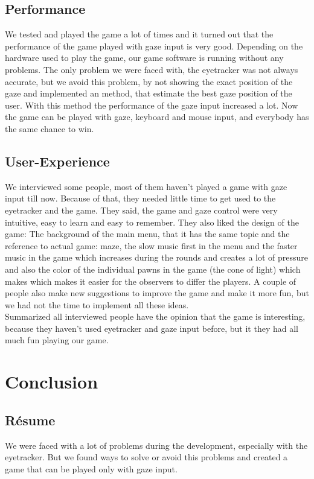 \documentclass{sigchi}
\begin{document}
\subsection{Performance}
We tested and played the game a lot of times and it turned out that the performance of the game played with gaze input is very good. Depending on the hardware used to play the game, our game software is running without any problems. The only problem we were faced with, the eyetracker was not always accurate, but we avoid this problem, by not showing the exact position of the gaze and implemented an method, that estimate the best gaze position of the user. With this method the performance of the gaze input increased a lot. Now the game can be played with gaze, keyboard and mouse input, and everybody has the same chance to win.
\subsection{User-Experience}
We interviewed some people, most of them haven't played a game with gaze input till now. Because of that, they needed little time to get used to the eyetracker and the game. They said, the game and gaze control were very intuitive, easy to learn and easy to remember. They also liked the design of the game: The background of the main menu, that it has the same topic and the reference to actual game: maze, the slow music first in the menu and the faster music in the game which increases during the rounds and creates a lot of pressure and also the color of the individual pawns in the game (the cone of light) which makes which makes it easier for the observers to differ the players.
A couple of people also make new suggestions to improve the game and make it more fun, but we had not the time to implement all these ideas.\\
Summarized all interviewed people have the opinion that the game is interesting, because they haven't used eyetracker and gaze input before, but it they had all much fun playing our game.

\section{Conclusion}
\subsection{R{\'e}sume}
We were faced with a lot of problems during the development, especially with the eyetracker. But we found ways to solve or avoid this problems and created a game that can be played only with gaze input.
\end{document}
